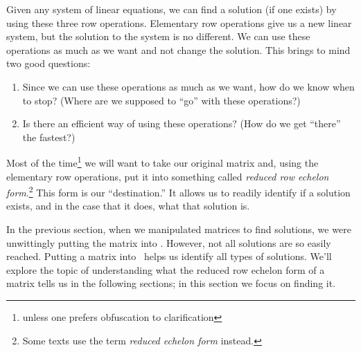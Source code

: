 
Given any system of linear equations, we can find a solution (if one exists) by using these three row operations. Elementary row operations give us a new linear system, but the solution to the system is no different. We can use these operations as much as we want and not change the solution. This brings to mind two good questions:
\begin{enumerate}
\item		Since we can use these operations as much as we want, how do we know when to stop? (Where are we supposed to ``go'' with these operations?)
\item		Is there an efficient way of using these operations? (How do we get ``there'' the fastest?)
\end{enumerate}

Most of the time\footnote{unless one prefers obfuscation to clarification} we will want to take our original matrix and, using the elementary row operations, put it into something called \textit{reduced row echelon form}.\footnote{Some texts use the term \textit{reduced echelon form} instead.} This form is our ``destination.'' It allows us to readily identify if a solution exists, and in the case that it does, what that solution is. 

In the previous section, when we manipulated matrices to find solutions, we were unwittingly putting the matrix into \rref. However, not all solutions are so easily reached. Putting a matrix into \rref\ helps us identify all types of solutions. We'll explore the topic of understanding what the reduced row echelon form of a matrix tells us in the following sections; in this section we focus on finding it.

